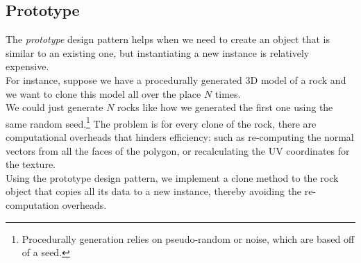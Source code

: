 \begin{multicols}{2}



\subsection{Prototype}

The \textit{prototype} design pattern helps when we need to create an object that is similar to an existing one, but instantiating a new instance is relatively expensive.\bs
\\
For instance, suppose we have a procedurally generated 3D model of a rock and we want to clone this model all over the place $N$ times.\bs
\\
We could just generate $N$ rocks like how we generated the first one using the same random seed.\footnote{Procedurally generation relies on pseudo-random or noise, which are based off of a seed.} The problem is for every clone of the rock, there are computational overheads that hinders efficiency: such as re-computing the normal vectors from all the faces of the polygon, or recalculating the UV coordinates for the texture.\bs
\\
Using the prototype design pattern, we implement a clone method to the rock object that copies all its data to a new instance, thereby avoiding the re-computation overheads.


\end{multicols}

